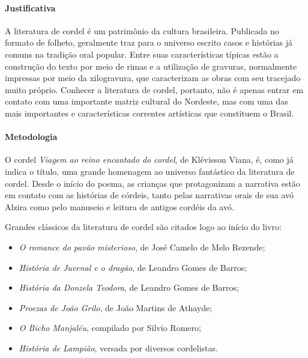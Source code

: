 \documentclass[11pt]{extarticle}
\begin{document}
\paragraph{Justificativa} A literatura de cordel é um patrimônio da cultura brasileira. Publicada no formato de folheto, geralmente traz para o universo escrito casos e histórias já comuns na tradição oral popular. Entre suas características típicas estão a construção do texto por meio de rimas e a utilização de gravuras, normalmente impressas por meio da xilogravura, que caracterizam as obras com seu tracejado muito próprio. Conhecer a literatura de cordel, portanto, não é apenas entrar em contato com uma importante matriz cultural do Nordeste, mas com uma das mais importantes e características correntes artísticas que constituem o Brasil.

\paragraph{Metodologia} O cordel \textit{Viagem ao reino encantado do cordel}, de Klévisson Viana, é, como já indica o título, uma grande homenagem ao universo fantástico da literatura de cordel. Desde o início do poema, as crianças que protagonizam a narrativa estão em contato com as histórias de córdeis, tanto pelas narrativas orais de sua avó Alzira como pelo manuseio e leitura de antigos cordéis da avó.

Grandes clássicos da literatura de cordel são citados logo ao início do livro:

\begin{itemize}
\item \textit{O romance do pavão misterioso}, de José Camelo de Melo Rezende;

\item \textit{História de Juvenal e o dragão}, de Leandro Gomes de Barros;

\item \textit{História da Donzela Teodora}, de Leandro Gomes de Barros;

\item \textit{Proezas de João Grilo}, de João Martins de Athayde;

\item \textit{O Bicho Manjaléu}, compilado por Silvio Romero;

\item \textit{História de Lampião}, versada por diversos cordelistas.
\end{itemize}
\end{document}
